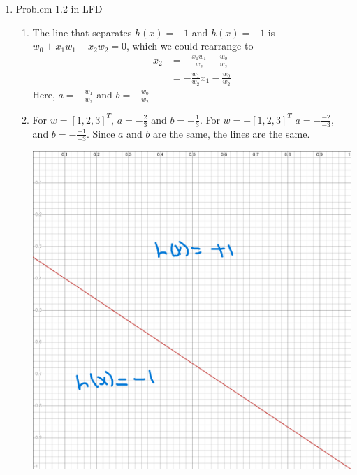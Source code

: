 \documentclass{article}
\begin{document}
\begin{enumerate}
        \item Problem 1.2 in LFD
        \begin{enumerate}[label=(\alph*)]
            \item The line that separates $h(x) = +1$ and $h(x) = -1$ is $w_0 + x_1w_1 + x_2w_2 = 0$, which we could rearrange to
            \begin{align*}
                x_2 &= -\frac{x_1w_1}{w_2} - \frac{w_0}{w_2}\\
                &= -\frac{w_1}{w_2}x_1 - \frac{w_0}{w_2}
            \end{align*}
            Here, $a = -\frac{w_1}{w_2}$ and $b = -\frac{w_0}{w_2}$

            \item For $w = [1,2,3]^T$, $a = -\frac{2}{3}$ and $b = -\frac{1}{3}$. For $w = -[1,2,3]^T$ $a = -\frac{-2}{-3}$, and $b = -\frac{-1}{-3}$. Since $a$ and $b$ are the same, the lines are the same.
            \begin{center}
                \includegraphics[scale=0.20]{images/desmos-graph.png}
            \end{center}
        \end{enumerate}


\end{enumerate}
\end{document}

